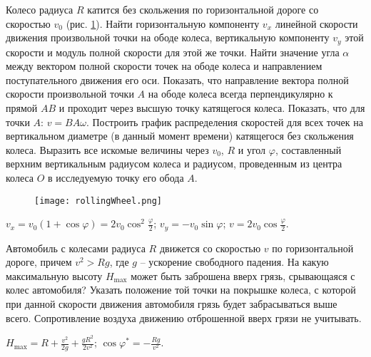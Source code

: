 \complexProblems

\begin{ex} %
Колесо радиуса $R$ катится без скольжения по горизонтальной дороге со скоростью $v_0$ (рис. \ref{rollingWheel}). Найти горизонтальную компоненту $v_x$ линейной скорости движения произвольной точки на ободе колеса, вертикальную компоненту $v_y$ этой скорости и модуль полной скорости для этой же точки. Найти значение угла $\alpha$ между вектором полной скорости точек на ободе колеса и направлением поступательного движения его оси. Показать, что направление вектора полной скорости произвольной точки $A$ на ободе колеса всегда перпендикулярно к прямой $AB$ и проходит через высшую точку катящегося колеса. Показать, что для точки $A$: $v = BA \omega$. Построить график распределения скоростей для всех точек на вертикальном диаметре (в данный момент времени) катящегося без скольжения колеса. Выразить все искомые величины через $v_0$, $R$ и угол $\varphi$, составленный верхним вертикальным радиусом колеса и радиусом, проведенным из центра колеса $O$ в исследуемую точку его обода $A$.

\begin{figure}[h]
\centering
\texttt{[image: rollingWheel.png]}
\caption{}
\label{rollingWheel}
\end{figure}

\begin{ans}
$v_x = v_0 (1 + \cos \varphi) = 2v_0 \cos^2 \frac{\varphi}{2}$; $v_y = -v_0 \sin \varphi$; $v = 2v_0 \cos \frac{\varphi}{2}$.
\end{ans}
\end{ex}

\begin{ex} %
Автомобиль с колесами радиуса $R$ движется со скоростью $v$ по горизонтальной дороге, причем $v^2 > Rg$, где $g$ -- ускорение свободного падения. На какую максимальную высоту $H_{\max}$ может быть заброшена вверх грязь, срывающаяся с колес автомобиля? Указать положение той точки на покрышке колеса, с которой при данной скорости движения автомобиля грязь будет забрасываться выше всего. Сопротивление воздуха движению отброшенной вверх грязи не учитывать.
\begin{ans}
$H_{\max} = R + \frac{v^2}{2g} + \frac{gR^2}{2v^2}$; $\cos \varphi^{*} = - \frac{Rg}{v^2}$.
\end{ans}
\end{ex}

